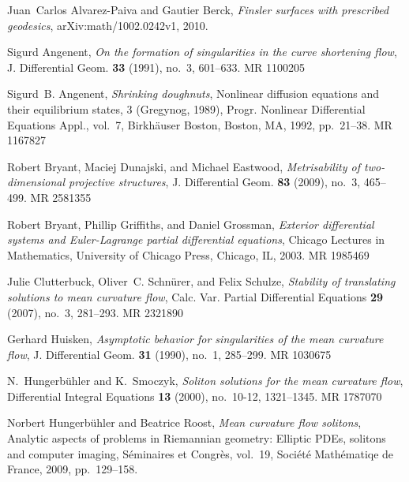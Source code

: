 \documentclass[11pt,letterpaper]{amsart}
\theoremstyle{definition}
\numberwithin{equation}{section}
\begin{document}
\providecommand{\bysame}{\leavevmode\hbox to3em{\hrulefill}\thinspace}
\providecommand{\MR}{\relax\ifhmode\unskip\space\fi MR }
\providecommand{\MRhref}[2]{  \href{http://www.ams.org/mathscinet-getitem?mr=#1}{#2}
}
\providecommand{\href}[2]{#2}
\begin{thebibliography}{10}

Juan~Carlos Alvarez-Paiva and Gautier Berck, \emph{Finsler surfaces with
  prescribed geodesics},
  \href{http://arxiv.org/abs/1002.0243}{ar{X}iv:math/1002.0242v1}, 2010.

Sigurd Angenent, \emph{On the formation of singularities in the curve
  shortening flow}, J. Differential Geom. \textbf{33} (1991), no.~3, 601--633.
  \MR{1100205}

Sigurd~B. Angenent, \emph{Shrinking doughnuts}, Nonlinear diffusion equations
  and their equilibrium states, 3 ({G}regynog, 1989), Progr. Nonlinear
  Differential Equations Appl., vol.~7, Birkh\"auser Boston, Boston, MA, 1992,
  pp.~21--38. \MR{1167827}

Robert Bryant, Maciej Dunajski, and Michael Eastwood, \emph{Metrisability of
  two-dimensional projective structures}, J. Differential Geom. \textbf{83}
  (2009), no.~3, 465--499. \MR{2581355}

Robert Bryant, Phillip Griffiths, and Daniel Grossman, \emph{Exterior
  differential systems and {E}uler-{L}agrange partial differential equations},
  Chicago Lectures in Mathematics, University of Chicago Press, Chicago, IL,
  2003. \MR{1985469}

Julie Clutterbuck, Oliver~C. Schn{\"u}rer, and Felix Schulze, \emph{Stability
  of translating solutions to mean curvature flow}, Calc. Var. Partial
  Differential Equations \textbf{29} (2007), no.~3, 281--293. \MR{2321890}

Gerhard Huisken, \emph{Asymptotic behavior for singularities of the mean
  curvature flow}, J. Differential Geom. \textbf{31} (1990), no.~1, 285--299.
  \MR{1030675}

N.~Hungerb{\"u}hler and K.~Smoczyk, \emph{Soliton solutions for the mean
  curvature flow}, Differential Integral Equations \textbf{13} (2000),
  no.~10-12, 1321--1345. \MR{1787070}

Norbert Hungerb\"uhler and Beatrice Roost, \emph{Mean curvature flow solitons},
  Analytic aspects of problems in Riemannian geometry: Elliptic PDEs, solitons
  and computer imaging, S\'eminaires et Congr\`es, vol.~19, Soci\'et\'e
  Math\'ematiqe de France, 2009, pp.~129--158.


\end{thebibliography}
\end{document}
